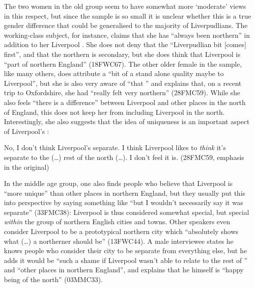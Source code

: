 The two women in the old group seem to have somewhat more `moderate' views in this respect, but since the sample is so small it is unclear whether this is a true gender difference that could be generalised to the majority of Liverpudlians.
The working-class subject, for instance, claims that she has ``always been northern'' in addition to her Liverpool .
She does not deny that the ``Liverpudlian bit [comes] first'', and that the northern  is secondary, but she does think that Liverpool is ``part of northern England'' (18FWC67).
The other older female in the sample, like many others, does attribute a ``bit of a stand alone quality maybe to Liverpool'', but she is also very aware  of ``that '' and explains that, on a recent trip to Oxfordshire, she had ``really felt very northern'' (28FMC59).
While she also feels ``there is a difference'' between Liverpool and other places in the north of England, this does not keep her from including Liverpool in the north.
Interestingly, she also suggests that the idea of uniqueness is an important aspect of Liverpool's :
\begin{example}
	No, I don't think Liverpool's separate. I think Liverpool likes to \emph{think} it's separate to the (\ldots) rest of the north (\ldots). I don't feel it is. (28FMC59, emphasis in the original)
\end{example}

In the middle age group, one also finds people who believe that Liverpool is ``more unique'' than other places in northern England, but they usually put this into perspective by saying something like ``but I wouldn't necessarily say it was separate'' (33FMC38): Liverpool is thus considered somewhat special, but special \emph{within} the group of northern English cities and towns.
Other speakers even consider Liverpool to be a prototypical northern city which ``absolutely shows what (\ldots) a northerner should be'' (13FWC44).
A male interviewee states he knows people who consider their city to be separate from everything else, but he adds it would be ``such a shame if Liverpool wasn't able to relate to the rest of '' and ``other places in northern England'', and explains that he himself is ``happy being of the north'' (03MMC33).

